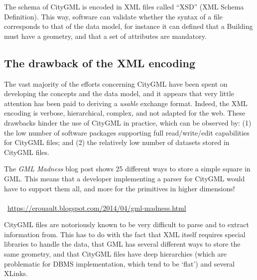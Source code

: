The schema of CityGML is encoded in XML files called ``XSD'' (XML Schema Definition).
This way, software can validate whether the syntax of a file corresponds to that of the data model, for instance it can defined that a Building must have a geometry, and that a set of attributes are mandatory.




\subsection{The drawback of the XML encoding}

The vast majority of the efforts concerning CityGML have been spent on developing the concepts and the data model, and it appears that very little attention has been paid to deriving a \emph{usable} exchange format.
Indeed, the XML encoding is verbose, hierarchical, complex, and not adapted for the web.
These drawbacks hinder the use of CityGML in practice, which can be observed by: (1) the low number of software packages supporting full read/write/edit capabilities for CityGML files; and (2) the relatively low number of datasets stored in CityGML files.

\begin{kaobox-warning}[frametitle=\faExclamationTriangle\ GML madness]
  The \emph{GML Madness} blog post shows 25 different ways to store a simple square in GML\@. 
  This means that a developer implementing a parser for CityGML would have to support them all, and more for the primitives in higher dimensions! 
  \\ \\
  \faExternalLink\ \url{https://erouault.blogspot.com/2014/04/gml-madness.html}
\end{kaobox-warning}

CityGML files are notoriously known to be very difficult to parse and to extract information from.
This has to do with the fact that XML itself requires special libraries to handle the data, that GML has several different ways to store the same geometry, and that CityGML files have deep hierarchies (which are problematic for DBMS implementation, which tend to be `flat') and several XLinks.




